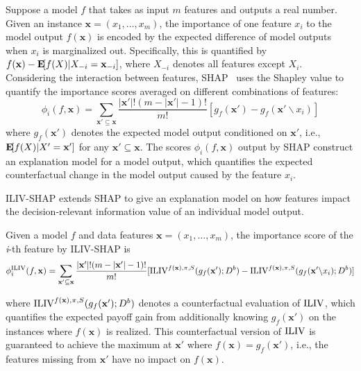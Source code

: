 Suppose a model $f$ that takes as input $m$ features and outputs a real number.
Given an instance $\mathbf{x} = (x_1, \ldots, x_m)$, the importance of one feature $x_i$ to the model output $f(\mathbf{x})$ is encoded by the expected difference of model outputs when $x_i$ is marginalized out.
Specifically, this is quantified by $f(\mathbf{x}) - \expect{f(X) | X_{-i} = \mathbf{x}_{-i}}$, where $X_{-i}$ denotes all features except $X_i$.
Considering the interaction between features, SHAP~\citep{lundberg2017unified} uses the Shapley value to quantify the importance scores averaged on different combinations of features:
\begin{equation*}
    \phi_i(f, \mathbf{x}) = \sum_{\mathbf{x}' \subseteq \mathbf{x}} \frac{|\mathbf{x}'|!(m - |\mathbf{x}'| - 1)!}{m!} [g_f(\mathbf{x}') - g_f(\mathbf{x}' \backslash x_i)]
\end{equation*}
\noindent where $g_f(\mathbf{x}')$ denotes the expected model output conditioned on $\mathbf{x}'$, i.e., $\expect{f(X)| X' = \mathbf{x}'}$ for any $\mathbf{x}' \subseteq \mathbf{x}$. The scores $\phi_i(f, \mathbf{x})$ output by SHAP construct an explanation model for a model output, which quantifies the expected counterfactual change in the model output caused by the feature $x_i$.

ILIV-SHAP extends SHAP to give an explanation model on how features impact the decision-relevant information value of an individual model output.

\begin{definition}
\label{def:shap}
Given a model $f$ and data features $\mathbf{x} = (x_1, \ldots, x_m)$, the importance score of the \textit{i}-th feature by ILIV-SHAP is 
\begin{equation*}
    \phi_i^{\operatorname{ILIV}}(f, \mathbf{x}) = \sum_{\mathbf{x}' \subseteq \mathbf{x}} \frac{|\mathbf{x}'|!(m - |\mathbf{x}'| - 1)!}{m!} [\operatorname{ILIV}^{f(\mathbf{x}), \pi, S}(g_f(\mathbf{x}'); D^b) - \operatorname{ILIV}^{f(\mathbf{x}), \pi, S}(g_f(\mathbf{x}' \backslash x_i); D^b)]
\end{equation*}
\end{definition}
\noindent where $\operatorname{ILIV}^{f(\mathbf{x}), \pi, S}(g_f(\mathbf{x}'); D^b)$ denotes a counterfactual evaluation of $\operatorname{ILIV}$, which quantifies the expected payoff gain from additionally knowing $g_f(\mathbf{x}')$ on the instances where $f(\mathbf{x})$ is realized. 
This counterfactual version of $\operatorname{ILIV}$ is guaranteed to achieve the maximum at $\mathbf{x}'$ where $f(\mathbf{x}) = g_f(\mathbf{x}')$, i.e., the features missing from $\mathbf{x}'$ have no impact on $f(\mathbf{x})$.

